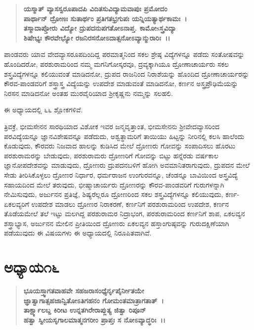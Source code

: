 \begin{verse}
\textbf{ಯಸ್ಮಾತ್ ವ್ಯಾಸಸ್ವರೂಪಾದಪಿ ವಿದಿತಸುವಿದ್ಯಾಮವಾಪುಃ ಪ್ರಮೋದಂ}\\\textbf{ಪಾರ್ಥಾನ್ ದ್ರೋಣಃ ಸುತಾರ್ಥಂ ಪ್ರತಿಗತಭ್ರಗುಪಃ ಯನ್ನಿಯತ್ಯಾರ್ಥಕಾಮಃ~।}\\\textbf{ತಸ್ಮಾದಾಪ್ತೋರು ವಿದ್ಯೋ ದ್ರುಪದನುಪಗತೋಽನಾಪ್ತ. ಕಾಮೋsಸ್ತ್ರವಿದ್ಯಾ} \\\textbf{ಶಿಷೇಭ್ಯಃ ಕೌರವೇಭ್ಯೋ ರಜನಿರಸನೋಽದಾತ್ಸನೋಽವ್ಯಾನ್ಮುರಾರಿಃ~।।}
\end{verse}

ಪಾಂಡವರು ಯಾವ ವೇದವ್ಯಾಸರೂಪದಿಂದಿದ್ದ ಪರಮಾತ್ಮನಿಂದ ಸಕಲ ಶ್ರೇಷ್ಠ ವಿದ್ಯೆಗಳನ್ನೂ ಪಡೆದು ಸಂತೋಷವನ್ನು ಹೊಂದಿದರೋ, ಪರಶುರಾಮರಿಂದ ನಮ್ಮ ಮಗನಿಗೋಸ್ಕರವೂ, ದ್ರವ್ಯಕ್ಕಾಗಿಯೂ ದ್ರೋಣಾಚಾರ್ಯರು ಸಕಲ ಶಸ್ತ್ರವಿದ್ಯೆಗಳನ್ನೂ ಕಲಿಯುವಂತೆ ಮಾಡಿದನೋ, ದ್ರುಪದ ರಾಜನಿಂದ ನಿರಾಶೆಯನ್ನು ಹೊಂದಿದ ದ್ರೋಣಾಚಾರ್ಯರನ್ನು ಕೌರವ-ಪಾಂಡವರಿಗೆ ಶಸ್ತ್ರಾಸ್ತ್ರ ವಿದ್ಯೆಯನ್ನು ಉಪದೇಶ ಮಾಡುವಂತೆ ಮಾಡಿದನೋ, ಕರ್ಣನ ಅಸ್ತ್ರಪ್ರೌಢಿಮೆಯನ್ನು ನಿರಸನ ಮಾಡಿದನೋ ಅಂತಹ ಮುರವೈರಿಯಾದ ಶ‍್ರೀಕೃಷ್ಣನು ನಮ್ಮನ್ನು ಸಲಹಲಿ.

ಈ ಅಧ್ಯಾಯದಲ್ಲಿ ೬೬ ಶ್ಲೋಕಗಳಿವೆ.

ತ್ರಿವಕ್ರೆ, ಭೀಮಸೇನನ ಸಾರಥಿಯಾದ ವಿಶೋಕ ಇವರ ಜನ್ಮವೃತ್ತಾಂತ, ಭೀಮಸೇನನು ಶ‍್ರೀವೇದವ್ಯಾಸರಿಂದ ಪರವಿದ್ಯೆಯನ್ನೂ ಜ್ಞಾನವಿಶೇಷವನ್ನೂ ಪಡೆದುದು, ಅಶ್ವತ್ಥಾಮರಿಗೆ ತಾಯಿಯು ಹಿಟ್ಟನ್ನು ನೀರಿನಲ್ಲಿ ಕಲಸಿ ಹಾಲೆಂದು ಕೊಡುವುದು, ಕೌರವರು ನಿಜವಾದ ಹಾಲನ್ನು ಕುಡಿಸಿದ ಮೇಲೆ ದ್ರೋಣರು ಗೋವನ್ನು ಸಂಪಾದಿಸಲು ಹೊರಟು ಪರಶುರಾಮರನ್ನು ಬೇಡುವುದು, ಪರಶುರಾಮರು ದ್ರೋಣರಿಗೆ ಗೋವನ್ನು ಬಿಟ್ಟು ಹನ್ನೆರಡು ವರ್ಷಕಾಲ ಜ್ಞಾನೋಪದೇಶವನ್ನು ಮಾಡುವುದು, ದ್ರೋಣರು ದ್ರುಪದನಬಳಿಗೆ ಹೋಗಿ ಅವಮಾನಿತರಾಗುವುದು, ದ್ರುಪದನ ಮೇಲೆ ಸೇಡು ತೀರಿಸಿಕೊಳ್ಳಲು ದ್ರೋಣರ ನಿರ್ಧಾರ, ಧರ್ಮರಾಜನ ಉಂಗುರವನ್ನೂ, ಚೆಂಡನ್ನೂ ಬಾವಿಯಿಂದ ಅಸ್ತ್ರವಿದ್ಯೆ ಸಹಾಯದಿಂದ ಮೇಲೆ ತರುವುದು, ಭೀಷ್ಮಾಚಾರ್ಯರು ದ್ರೋಣರನ್ನು ಕೌರವ-ಪಾಂಡವರಿಗೆ ಗುರುಗಳನ್ನಾಗಿ ನೇಮಿಸುವುದು, ಅರ್ಜುನನ ಪ್ರತಿಜ್ಞೆ, ಶಿಷ್ಯರೆಲ್ಲರೂ ದ್ರೋಣರಿಂದ ಸಕಲ ಶಸ್ತ್ರವಿದ್ಯೆಗಳನ್ನೂ ಕಲಿಯುವುದು, ಕರ್ಣ-ಏಕಲವ್ಯರಿಗೆ ಉಪದೇಶ ಮಾಡಲು ದ್ರೋಣರ ನಿರಾಕರಣೆ, ಕರ್ಣನಿಗೆ ಪರಶುರಾಮರಿಂದ ಉಪದೇಶ, ಕರ್ಣನ ತೊಡೆಯಮೇಲೆ ತಲೆ ಇಟ್ಟು ಮಲಗಿದ್ದ ಪರಶುರಾಮರ ನಿದ್ರಾಭಂಗ, ಪರಶುರಾಮರಿಂದ ಕರ್ಣನಿಗೆ ಶಾಪ, ಏಕಲವ್ಯನ ಶಸ್ತ್ರಾಭ್ಯಾಸ, ಅರ್ಜುನನ ಮೇಲಿನ ಪ್ರೀತಿಯಿಂದ ದ್ರೋಣರು ಏಕಲವ್ಯನ ಹಸ್ತಾಂಗುಷ್ಠವನ್ನು ಗುರುದಕ್ಷಿಣೆಯಾಗಿ ಪಡೆಯುವುದು ಈ ವಿಷಯಗಳು ಈ ಅಧ್ಯಾಯದಲ್ಲಿ ನಿರೂಪಿತವಾಗಿವೆ.


\section*{ಅಧ್ಯಾಯ\enginline{-}೧೬}

\begin{verse}
\textbf{ಭೂಯಸ್ತ್ವಾಗತವಾಹವೇ ಸಹಜರಾಸಂಧ್ಯೆರ್ನೃಪೈರ್ನೀತಯೇ }\\\textbf{ಜ್ಞಾತ್ವಾಗಾತ್ಸಹಜಾನ್ವಿತೋಽತಿಗಹನಂ ಗೋಮಂತಮಾತ್ರಾಗತಾತ್~।}\\\textbf{ತಾರ್ಕ್ಷ್ಯಾಲಬ್ದ ಕಿರೀಟ ಉನ್ನತಗಿರೇರಾಪ್ಲುತ್ಯ ಜಿತ್ವಾ ರಿಪೂನ್}\\\textbf{ಹತ್ವಾ ಸ್ವೀಯಸೃಗಾಲಮಾತ್ಮನಗರೀಂ ಪ್ರಾಪ್ತಃ ಸ ನೋಽವ್ಯಾದ್ಧರಿಃ~।।}
\end{verse}

